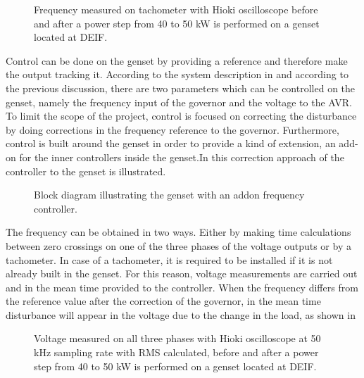 \begin{figure}[H]
\centering
 
\caption{Frequency measured on tachometer with Hioki oscilloscope before and after a power step from 40 to 50 kW is performed on a genset located at DEIF.}
\label{fig:4050kwstepfreq}
\end{figure}


Control can be done on the genset by providing a reference and therefore make the output tracking it. According to the system description in  and according to the previous discussion, there are two parameters which can be controlled on the genset, namely the frequency input of the governor and the voltage to the AVR. To limit the scope of the project, control is focused on correcting the disturbance by doing corrections in the frequency reference to the governor. Furthermore, control is built around the genset in order to provide a kind of extension, an add-on for the inner controllers inside the genset.In  this correction approach of the controller to the genset is illustrated.

\begin{figure}[H]
\centering
 
\caption{Block diagram illustrating the genset with an addon frequency controller.}
\label{fig:genset_control_approach}
\end{figure}


The frequency can be obtained in two ways. Either by making time calculations between zero crossings on one of the three phases of the voltage outputs or by a tachometer. In case of a tachometer, it is required to be installed if it is not already built in the genset. For this reason, voltage measurements are carried out and in the mean time provided to the controller.
When the frequency differs from the reference value after the correction of the governor, in the mean time disturbance will appear in the voltage due to the change in the load, as shown in   

\begin{figure}[H]
\centering
 
\caption{Voltage measured on all three phases with Hioki oscilloscope at 50 kHz sampling rate with RMS calculated, before and after a power step from 40 to 50 kW is performed on a genset located at DEIF.}
\label{fig:4050kwstepvoltage50khz}
\end{figure}

